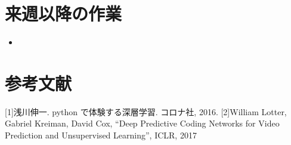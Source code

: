 \section{来週以降の作業}
\begin{itemize}
         \item 
\end{itemize}

\section{参考文献}
[1]浅川伸一. python で体験する深層学習. コロナ社, 2016.
[2]William Lotter, Gabriel Kreiman, David Cox, “Deep Predictive Coding Networks for Video Prediction and Unsupervised Learning”, ICLR, 2017




